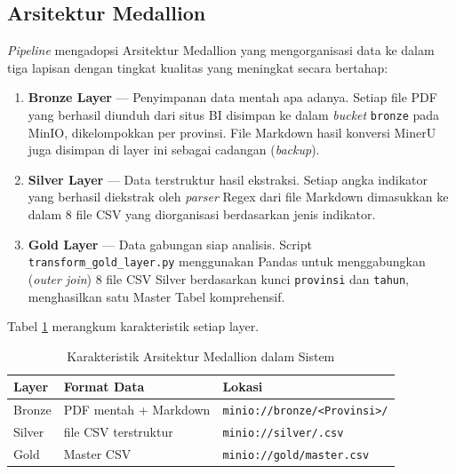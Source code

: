 \documentclass[10pt, a4paper, twocolumn]{article}
\begin{document}
\subsection{Arsitektur Medallion}

\textit{Pipeline} mengadopsi Arsitektur Medallion \cite{databricks_medallion} yang mengorganisasi data ke dalam tiga lapisan dengan tingkat kualitas yang meningkat secara bertahap:

\begin{enumerate}[leftmargin=*, label=\textbf{\alph*.}]
  \item \textbf{Bronze Layer} --- Penyimpanan data mentah apa adanya. Setiap file PDF yang berhasil diunduh dari situs BI disimpan ke dalam \textit{bucket} \texttt{bronze} pada MinIO, dikelompokkan per provinsi. File Markdown hasil konversi MinerU juga disimpan di layer ini sebagai cadangan (\textit{backup}).
  
  \item \textbf{Silver Layer} --- Data terstruktur hasil ekstraksi. Setiap angka indikator yang berhasil diekstrak oleh \textit{parser} Regex dari file Markdown dimasukkan ke dalam 8 file CSV yang diorganisasi berdasarkan jenis indikator.
  
  \item \textbf{Gold Layer} --- Data gabungan siap analisis. Script \texttt{transform\_gold\_layer.py} menggunakan Pandas untuk menggabungkan (\textit{outer join}) 8 file CSV Silver berdasarkan kunci \texttt{provinsi} dan \texttt{tahun}, menghasilkan satu Master Tabel komprehensif.
\end{enumerate}

\noindent Tabel \ref{tab:medallion} merangkum karakteristik setiap layer.

\begin{table}[H]
\centering
\caption{Karakteristik Arsitektur Medallion dalam Sistem}
\label{tab:medallion}
\fontsize{8}{10}\selectfont
\begin{tabularx}{\linewidth}{|l|>{\raggedright\arraybackslash}X|>{\raggedright\arraybackslash}X|}
\hline
\textbf{Layer} & \textbf{Format Data} & \textbf{Lokasi} \\
\hline
Bronze & PDF mentah + Markdown & \texttt{minio://\allowbreak bronze/\allowbreak <Provinsi>/} \\
\hline
Silver & 8 file CSV terstruktur & \texttt{minio://\allowbreak silver/\allowbreak *.csv} \\
\hline
Gold & 1 Master CSV & \texttt{minio://\allowbreak gold/\allowbreak master.csv} \\
\hline
\end{tabularx}
\end{table}
\end{document}
